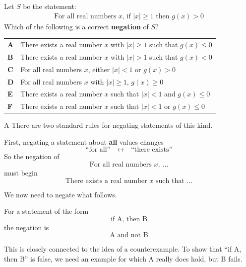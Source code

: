 \documentclass[11pt,a4paper]{article}
\begin{document}
\begin{enumerate}[label=\textbf{\arabic*.},leftmargin=*,itemsep=0pt,start=14]
\questionitem[Logic]
Let $S$ be the statement: \[ \begin{array}{c}
\text{For all real numbers $x$, if $|x| \ge 1$ then $g(x) > 0$}
\end{array} \] Which of the following is a correct \textbf{negation} of $S$?

\par\vspace*{12pt}
\begin{tabularx}{\linewidth}{@{}>{\bfseries}l Y@{}}
A &
There exists a real number $x$ with $|x| \ge 1$ such that $g(x) \le 0$
\\[0.8em]
B &
There exists a real number $x$ with $|x| > 1$ such that $g(x) < 0$
\\[0.8em]
C &
For all real numbers $x$, either $|x| < 1$ or $g(x) > 0$
\\[0.8em]
D &
For all real numbers $x$ with $|x| \ge 1$, $g(x) \ge 0$
\\[0.8em]
E &
There exists a real number $x$ such that $|x| < 1$ and $g(x) \le 0$
\\[0.8em]
F &
There exists a real number $x$ such that $|x| < 1$ or $g(x) \le 0$
\\
\end{tabularx}

\begin{djsSolution}{A}
There are two standard rules for negating statements of this kind.

First, negating a statement about \textbf{all} values changes
\[
\text{``for all''}\quad\longleftrightarrow\quad\text{``there exists''}
\]
So the negation of
\[
\text{For all real numbers }x,\ \ldots
\]
must begin
\[
\text{There exists a real number }x\text{ such that }\ldots
\]

We now need to negate what follows.

For a statement of the form
\[
\text{if A, then B}
\]
the negation is
\[
\text{A and not B}
\]

This is closely connected to the idea of a counterexample. To show that ``if A, then B'' is false, we need an example for which A really does hold, but B fails.


\end{djsSolution}
\end{enumerate}
\end{document}
